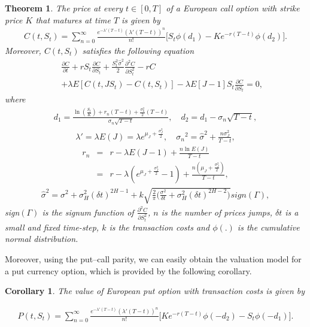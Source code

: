 \documentclass[a4paper,11pt]{amsart}
\numberwithin{equation}{section}
\theoremstyle{definition}
\theoremstyle{plain}
\newtheorem{thm}{Theorem}[section]
\newtheorem{cor}{Corollary}[section]
\theoremstyle{definition}
\newcommand{\1}{\mathbf{1}}
\begin{document}
\begin{thm} The price at every $t\in [0,T]$ of a European call option with strike price $K$ that matures at time $T$ is
given by
\begin{eqnarray}
C(t,S_t)=\sum_{n=0}^\infty\frac{e^{-\lambda'(T-t)}(\lambda'(T-t))^n}{n!}\Big[S_t\phi(d_1)-Ke^{-r(T-t)}\phi(d_2)\Big].
\label{eq:5}
\end{eqnarray}
Moreover, $C(t,S_t)$ satisfies the following equation
\begin{eqnarray}
&&\frac{\partial C}{\partial t}+rS_t\frac{\partial C}{\partial S_t}+\frac{S_t^2\widehat{\sigma}^2}{2}\frac{\partial^2 C}{\partial S_t^2}-rC\nonumber\\
&&+\lambda E[C(t,JS_t)-C(t,S_t)]-\lambda E[J-1]S_t\frac{\partial C}{\partial S_t}=0,
\label{eq:5-1}
\end{eqnarray}
where
\begin{eqnarray}
d_1=\frac{\ln\left(\frac{S_t}{K}\right)+r_n(T-t)+\frac{\sigma_n^2}{2}(T-t)}{\sigma_n\sqrt{T-t}},\quad d_2=d_1-\sigma_n\sqrt{T-t},
\label{eq:6}
\end{eqnarray}
\begin{eqnarray}
\lambda'=\lambda E(J)=\lambda e^{\mu_J+\frac{\sigma_J^2}{2}},\quad{\sigma_n}^2=\widehat{\sigma}^2+\frac{n\sigma_J^2}{T-t},
\label{eq:7}
\end{eqnarray}
\begin{eqnarray}
r_n&=&r-\lambda E(J-1)+\frac{n\ln E(J)}{T-t}\nonumber\\
&=&r-\lambda (e^{\mu_J+\frac{\sigma_J^2}{2}}-1)+\frac{n(\mu_J+\frac{\sigma_J^2}{2})}{T-t},
\label{eq:8}
\end{eqnarray}
\begin{eqnarray}
\widehat{\sigma}^2=\sigma^2+\sigma_H^2(\delta t)^{2H-1}+k\sqrt{\frac{2}{\pi}\Big(\frac{\sigma^2}{\delta t}+\sigma_H^2(\delta t)^{2H-2}\Big)}sign(\Gamma),
\label{eq:9}
\end{eqnarray}
sign$(\Gamma)$ is the signum function of $\frac{\partial^2C}{\partial S_t^2}$, $n$ is the number of prices jumps, $\delta t$ is a small and fixed time-step, $k$ is the transaction costs and $\phi(.)$ is the cumulative normal distribution.
\label{th:3-1}
\end{thm}



Moreover, using the put–call parity, we can easily obtain the valuation model for a put currency option, which is provided
by the following corollary.
\begin{cor} The value of European put option with transaction costs is given by

\begin{eqnarray}
P(t,S_t)=\sum_{n=0}^\infty\frac{e^{-\lambda'(T-t)}(\lambda'(T-t))^n}{n!}\Big[Ke^{-r(T-t)}\phi(-d_2)-S_t\phi(-d_1)\Big]\nonumber.
\label{eq:10}
\end{eqnarray}
\end{cor}
\end{document}
